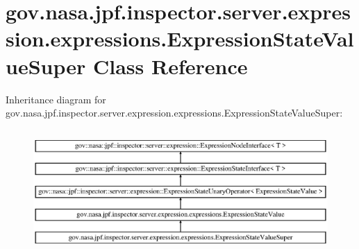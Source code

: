 \hypertarget{classgov_1_1nasa_1_1jpf_1_1inspector_1_1server_1_1expression_1_1expressions_1_1_expression_state_value_super}{}\section{gov.\+nasa.\+jpf.\+inspector.\+server.\+expression.\+expressions.\+Expression\+State\+Value\+Super Class Reference}
\label{classgov_1_1nasa_1_1jpf_1_1inspector_1_1server_1_1expression_1_1expressions_1_1_expression_state_value_super}
Inheritance diagram for gov.\+nasa.\+jpf.\+inspector.\+server.\+expression.\+expressions.\+Expression\+State\+Value\+Super\+:\begin{figure}[H]
\begin{center}
\leavevmode
\includegraphics[height=4.745763cm]{classgov_1_1nasa_1_1jpf_1_1inspector_1_1server_1_1expression_1_1expressions_1_1_expression_state_value_super}
\end{center}
\end{figure}
